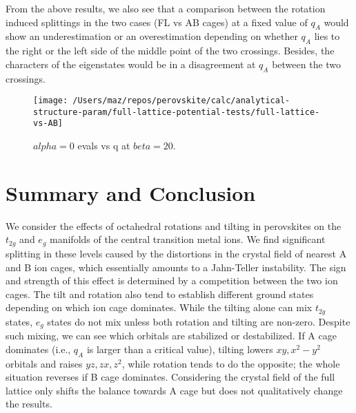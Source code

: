 \documentclass[a4paper,prb,twocolumn]{revtex4-1}  %
\newcommand{\com}[1]{}
\begin{document}
From the above results, we also see that
a comparison between the rotation induced splittings
 in the two
cases (FL vs AB cages)
at a fixed value of $q_A$
would show an underestimation or an overestimation 
depending on whether $q_A$ lies to the right or the left side of the 
middle point of the two crossings.
Besides, the characters of the eigenstates
would be in a disagreement at $q_A$
between the two crossings.




\com{
Since the qualitative picture stays the same
in FL case,
we can 
think of the effect of the rest of the ions in the lattice
still in terms of the AB cages by renormalising $q_A$.
}




\begin{figure}[htbp]
\begin{center}
\texttt{[image: /Users/maz/repos/perovskite/calc/analytical-structure-param/full-lattice-potential-tests/full-lattice-vs-AB]}
\caption{$alpha=0$ evals vs q at $beta=20$. 
}
\label{fig:t2g-lattice}
\end{center}
\end{figure}





\section{Summary and Conclusion}


We consider the effects of octahedral rotations and tilting in perovskites
on the $t_{2g}$ and $e_g$ manifolds of the central transition metal ions.
We find significant splitting in these levels
caused by the distortions in the crystal field of nearest A and B ion cages,
which
essentially amounts to a 
Jahn-Teller instability.
The sign and strength of this effect is 
determined by
a competition between the two ion cages.
The tilt 
and rotation 
also tend to establish different ground states
depending
on which ion cage dominates.
While the tilting alone can mix $t_{2g}$ states,
$e_g$ states
do not mix unless both rotation and tilting are non-zero.
Despite such mixing, we can see which orbitals are stabilized or destabilized.
If A cage dominates (i.e., $q_A$ is larger than a critical value),
tilting lowers
$xy,x^2-y^2$ orbitals
and raises $yz,zx,z^2$,
while 
rotation tends to do the opposite;
the whole situation reverses if B cage dominates.
Considering the crystal field of the full lattice 
only shifts the balance towards A cage
but does not qualitatively change the results.
\end{document}
